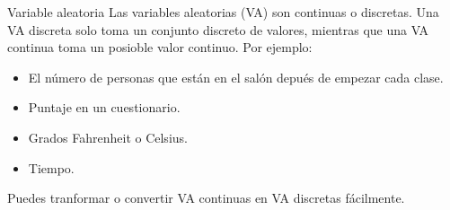 \begin{frame}{Variable aleatoria}
	Las variables aleatorias (VA) son continuas o discretas. Una VA discreta solo toma un conjunto discreto de valores, mientras que una VA continua toma un posioble valor continuo. Por ejemplo:
	\begin{itemize}
		\item El número de personas que están en el salón depués de empezar cada clase.
		\item Puntaje en un cuestionario.
		\item Grados Fahrenheit o Celsius.
		\item Tiempo.
	\end{itemize}
	Puedes tranformar o convertir VA continuas en VA discretas fácilmente.
\end{frame}
